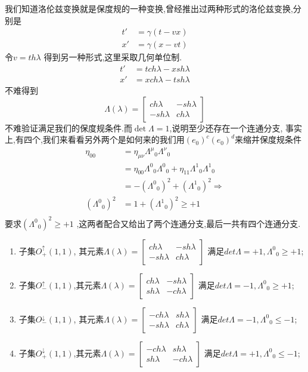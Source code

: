 \documentclass[../main.tex]{subfiles}
\begin{document}
 我们知道洛伦兹变换就是保度规的一种变换,曾经推出过两种形式的洛伦兹变换,分别是
 \begin{align*}
     t'& = \gamma(t - vx)\\
     x'& = \gamma(x - vt)
 \end{align*}
 令$v = th \lambda $ 得到另一种形式,这里采取几何单位制.
 \begin{align*}
     t'&= tch \lambda - xsh\lambda\\
     x'&=xch \lambda - tsh\lambda
 \end{align*}
 不难得到
 \begin{equation*}
     \Lambda(\lambda) = \begin{bmatrix}
        ch\lambda & - sh\lambda\\
        -sh\lambda &ch\lambda 
     \end{bmatrix}
 \end{equation*}
 不难验证满足我们的保度规条件.而$\det\Lambda = 1$,说明至少还存在一个连通分支,
 事实上,有四个,我们来看看另外两个是如何来的我们用$(e_0)^c(e_0)^d$来缩并保度规条件
 \begin{align*}
     \eta_{00} &= \eta_{\mu\nu}\Lambda^{\mu}{}_{0}\Lambda^{\nu}{}_{0}\\
               &=  \eta_{00}\Lambda^{0}{}_{0}\Lambda^{0}{}_{0} +  \eta_{11}\Lambda^{1}{}_{0}\Lambda^{1}{}_{0}\\
               &= -(\Lambda^{0}{}_{0})^2 + (\Lambda^{1}{}_{0})^2\Longrightarrow\\
     (\Lambda^{0}{}_{0})^2 &=1+ (\Lambda^{1}{}_{0})^2 \ge + 1\\
 \end{align*}
 要求$(\Lambda^{0}{}_{0})^2\ge +1$ ,这两者配合又给出了两个连通分支,最后一共有四个连通分支.
 \begin{enumerate}
     \item 子集$O^\uparrow_+(1,1)$, 其元素$\Lambda(\lambda) = \begin{bmatrix}ch\lambda&-sh\lambda \\ -sh\lambda & ch\lambda\end{bmatrix}$ 满足$det\Lambda = +1, \Lambda^0{}_0\ge +1$; 
     \item 子集$O^\uparrow_-(1,1)$,其元素$\Lambda(\lambda) = \begin{bmatrix}ch\lambda&-sh\lambda \\ sh\lambda &-ch\lambda\end{bmatrix}$ 满足$det\Lambda = -1, \Lambda^0{}_0\ge +1$;
     \item 子集$O^\downarrow_-(1,1)$, 其元素$\Lambda(\lambda) = \begin{bmatrix}-ch\lambda&sh\lambda \\ -sh\lambda & ch\lambda\end{bmatrix}$ 满足$det\Lambda = -1, \Lambda^0{}_0\le -1$;
     \item 子集$O^\downarrow_+(1,1)$,其元素$\Lambda(\lambda) = \begin{bmatrix}-ch\lambda&sh\lambda \\ sh\lambda &-ch\lambda\end{bmatrix}$ 满足$det\Lambda = +1, \Lambda^0{}_0\le -1$;
 \end{enumerate}
\end{document}
